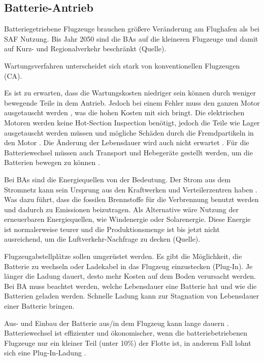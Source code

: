 \subsection{Batterie-Antrieb}


Batteriegetriebene Flugzeuge brauchen größere Veränderung am Flughafen als bei SAF Nutzung.
Bis Jahr 2050 sind die BAs auf die kleineren Flugzeuge und damit auf Kurz- und Regionalverkehr beschränkt (Quelle). 

Wartungsverfahren unterscheidet sich stark von konventionellen Flugzeugen (CA). 

Es ist zu erwarten, dass die Wartungskosten niedriger sein können durch weniger bewegende Teile in dem Antrieb. 
Jedoch bei einem Fehler muss den ganzen Motor ausgetauscht werden \cite{dalmia2022powering}, 
was die hohen Kosten mit sich bringt.
Die elektrischen Motoren werden keine Hot-Section Inspection benötigt, jedoch die Teile wie Lager ausgetauscht werden 
müssen und mögliche Schäden durch die Fremdpartikeln in den Motor \cite{reimers2018introduction}. 
Die Änderung der Lebensdauer wird auch nicht erwartet \cite{reimers2018introduction}.
Für die Batteriewechsel müssen auch Transport und Hebegeräte gestellt werden, um die Batterien bewegen zu können \cite{reimers2018introduction}.

Bei BAs sind die Energiequellen von der Bedeutung. 
Der Strom aus dem Stromnetz kann sein Ursprung aus den Kraftwerken und Verteilerzentren haben \cite{dalmia2022powering}. 
Was dazu führt, dass die fossilen Brennstoffe für die Verbrennung benutzt werden und dadurch zu Emissionen beizutragen. 
Als Alternative wäre Nutzung der erneuerbaren Energiequellen, wie Windenergie oder Solarenergie. Diese Energie ist normalerweise teurer
und die Produktionsmenge ist bis jetzt nicht ausreichend, um die Luftverkehr-Nachfrage zu decken (Quelle).

Flugzeugabstellplätze sollen umgerüstet werden. Es gibt die Möglichkeit, die Batterie zu wechseln oder Ladekabel 
in das Flugzeug einzustecken (Plug-In).
Je länger die Ladung dauert, desto mehr Kosten auf dem Boden verursacht werden. 
Bei BA muss beachtet werden, welche Lebensdauer eine Batterie hat und wie die Batterien geladen werden. Schnelle Ladung kann zur Stagnation von
Lebensdauer einer Batterie bringen.

Aus- und Einbau der Batterie aus/in dem Flugzeug kann lange dauern \cite{dalmia2022powering}. Batteriewechsel ist effizienter und ökonomischer, 
wenn die batteriebetriebenen Flugzeuge nur ein kleiner Teil (unter 10\%) der Flotte ist, in anderem Fall lohnt sich eine Plug-In-Ladung \cite{guo2020aviation}. 

